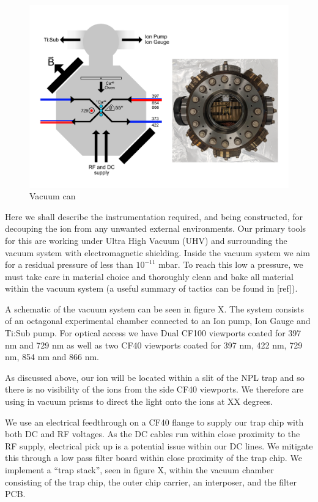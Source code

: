 \documentclass[12pt]{iopart}
\begin{document}
\begin{figure}
  \begin{center}
   \noindent\includegraphics[width=\linewidth]{figures/vacuum_can.pdf}
  \end{center}
  \caption{Vacuum can}
  \label{fig:can}
\end{figure}

Here we shall describe the instrumentation required, and being
constructed, for decouping the ion from any unwanted external
environments. Our primary tools for this are working under Ultra High
Vacuum (UHV) and surrounding the vacuum system with electromagnetic
shielding. Inside the vacuum system we aim for a residual pressure of
less than $10^{-11}$ mbar. To reach this low a pressure, we must take
care in material choice and thoroughly clean and bake all material
within the vacuum system (a useful summary of tactics can be found in [ref]).

A schematic of the vacuum system can be seen in figure X. The system
consists of an octagonal experimental chamber connected to an Ion
pump, Ion Gauge and Ti:Sub pump. For optical access we have Dual CF100
viewports coated for 397 nm and 729 nm as well as two CF40 viewports
coated for 397 nm, 422 nm, 729 nm, 854 nm and 866 nm.

As discussed above, our ion will be located within a slit of the NPL
trap and so there is no visibility of the ions from the side CF40
viewports. We therefore are using in vacuum prisms to direct the light
onto the ions at XX degrees.

We use an electrical feedthrough on a CF40 flange to supply our trap
chip with both DC and RF voltages. As the DC cables run within close
proximity to the RF supply, electrical pick up is a potential issue
within our DC lines. We mitigate this through a low pass filter board
within close proximity of the trap chip. We implement a ``trap
stack'', seen in figure X, within the vacuum chamber consisting of the
trap chip, the outer chip carrier, an interposer, and the filter PCB.
\end{document}
